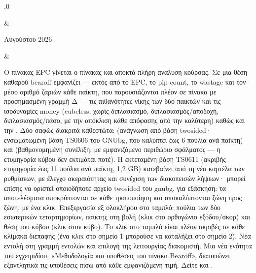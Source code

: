 \documentclass[letterpaper,10pt,greek]{sphinxmanual}
\begin{document}
\begin{savenotes}
\begin{longtable}{}
\begin{varwidth}[t]{}
.0
\sphinxbeforeendvarwidth
\end{varwidth}%
&\begin{varwidth}[t]{}
 Αυγούστου 2026
\sphinxbeforeendvarwidth
\end{varwidth}%
&\begin{varwidth}[t]{}
\sphinxAtStartPar
Ο πίνακας EPC γίνεται ο πίνακας  και αποκτά πλήρη ανάλυση κούρσας. Σε μια θέση καθαρού bearoff εμφανίζει — εκτός από το EPC, το pip count, το wastage και τον μέσο αριθμό ζαριών κάθε παίκτη, που παρουσιάζονται πλέον σε πίνακα με προσημασμένη γραμμή Δ — τις πιθανότητες νίκης των δύο παικτών και τις ισοδυναμίες money (cubeless, χωρίς διπλασιασμό, διπλασιασμός/αποδοχή, διπλασιασμός/πάσο, με την απόκλιση κάθε απόφασης από την καλύτερη) καθώς και την . Δύο σαφώς διακριτά καθεστώτα:  (ανάγνωση από βάση two\sphinxhyphen{}sided· ενσωματωμένη βάση TS\sphinxhyphen{}06\sphinxhyphen{}06 του GNUbg, που καλύπτει έως 6 πούλια ανά παίκτη) και  (βαθμονομημένη συνέλιξη, με εμφανιζόμενο περιθώριο σφάλματος — η ετυμηγορία κύβου δεν εκτιμάται ποτέ). Η εκτεταμένη βάση TS\sphinxhyphen{}06\sphinxhyphen{}11 (ακριβής ετυμηγορία έως 11 πούλια ανά παίκτη, 1,2 GB) κατεβαίνει από τη νέα καρτέλα  των ρυθμίσεων, με έλεγχο ακεραιότητας και συνέχιση των διακοπεισών λήψεων· μπορεί επίσης να οριστεί οποιοδήποτε αρχείο  two\sphinxhyphen{}sided του gnubg.  για εξάσκηση: τα αποτελέσματα αποκρύπτονται σε κάθε τροποποίηση και αποκαλύπτονται ζώνη προς ζώνη, με ένα κλικ. Επεξεργασία εξ ολοκλήρου στο ταμπλό: πούλια των δύο εσωτερικών τεταρτημορίων, παίκτης στη βολή (κλικ στο ορθογώνιο εξόδου/σκορ) και θέση του κύβου (κλικ στον κύβο). Το κλικ στο ταμπλό είναι πλέον ακριβές σε κάθε κλίμακα διεπαφής (ένα κλικ στο σημείο 1 μπορούσε να καταλήξει στο σημείο 2). Νέα εντολή  στη γραμμή εντολών και επιλογή  της λειτουργίας διακομιστή. Μια νέα ενότητα του εγχειριδίου, «Μεθοδολογία και υποθέσεις του πίνακα Bearoff», διατυπώνει εξαντλητικά τις υποθέσεις πίσω από κάθε εμφανιζόμενη τιμή. Δείτε {\hyperref[\detokenize{manuel:panneau-epc}]{}} και {\hyperref[\detokenize{manuel:epc-methodologie}]{}}.
\sphinxbeforeendvarwidth
\end{varwidth}%
\\
\sphinxbottomrule
\end{longtable}
\sphinxtableafterendhook
\sphinxatlongtableend
\end{savenotes}
\end{document}
